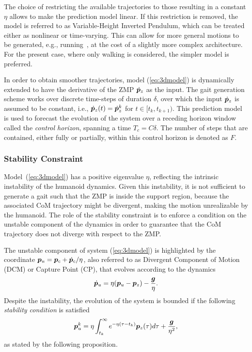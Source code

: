 The choice of restricting the available trajectories to those resulting in a constant $\eta$ allows to make the prediction model linear. If this restriction is removed, the model is referred to as Variable-Height Inverted Pendulum, which can be treated either as nonlinear or time-varying. This can allow for more general motions to be generated, e.g., running~\cite{Smaldone2022Running}, at the cost of a slightly more complex architecture. For the present case, where only walking is considered, the simpler model is preferred.

In order to obtain smoother trajectories, model (\ref{eq:3dmodel}) is dynamically extended to have the derivative of the ZMP $\dot {{\bm{p}}}_z$ as the input.
The gait generation scheme works over discrete time-steps of duration $\delta$, over which the input $\dot {{\bm{p}}}_z$ is assumed to be constant, i.e., $\dot {{\bm{p}}}_z(t) = \dot {{\bm{p}}}_z^k$ for $t\in[t_k, t_{k+1})$.
This prediction model is used to forecast the evolution of the system over a receding horizon window called the \emph{control horizon}, spanning a time $T_c=C\delta$. The number of steps that are contained, either fully or partially, within this control horizon is denoted as $F$.

\smallskip

\subsubsection{Stability Constraint}

Model~(\ref{eq:3dmodel}) has a positive eigenvalue $\eta$, reflecting the intrinsic instability of the humanoid dynamics. Given this instability, it is not sufficient to generate a gait such that the ZMP is inside the support region, because the associated CoM trajectory might be divergent, making the motion unrealizable by the humanoid.
The role of the stability constraint is to enforce a condition on the unstable component of the dynamics in order to guarantee that the CoM trajectory does not diverge with respect to the ZMP.

The unstable component of system (\ref{eq:3dmodel}) is highlighted by the coordinate ${\bm{p}}_u = {\bm{p}}_c + \dot {{\bm{p}}}_c/\eta$,
also referred to as Divergent Component of Motion (DCM) or Capture Point (CP), that evolves according to the dynamics
\begin{equation}
\dot{{\bm{p}}}_u = \eta({\bm{p}}_u - {\bm{p}}_z) - \frac{{\bm{g}}}{\eta}.
\end{equation}
Despite the instability, the evolution of the system is bounded if the following \emph{stability condition} is satisfied
\begin{equation}
\label{eq:stabilitycondition}
{\bm{p}}_u^k = \eta\int_{t_k}^{\infty}e^{-\eta(\tau - t_k)}{\bm{p}}_z(\tau) d\tau + \frac{{\bm{g}}}{\eta^2},
\end{equation}
as stated by the following proposition.

